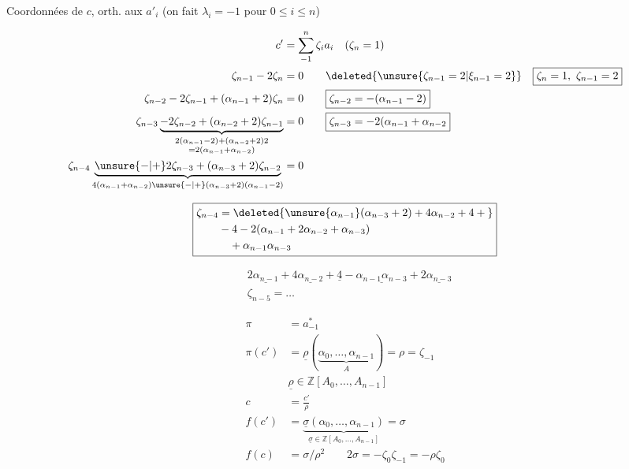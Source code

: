 Coordonnées  de $c$, orth. aux $a'_i$ (on fait $\lambda_i=-1$ pour $0\le i\le n$)

\[
\begin{aligned}
c'&=\sum_{-1}^{n}\zeta_i a_i\quad(\zeta_n=1)\\
\zeta_{n-1}-2\zeta_n&=0\qquad\deleted{\unsure{\zeta_{n-1}=2|\xi_{n-1}=2}}\quad\boxed{\zeta_n=1,\ \zeta_{n-1}=2}\\
\zeta_{n-2}-2\zeta_{n-1}+(\alpha_{n-1}+2)\zeta_n&=0\qquad\boxed{\zeta_{n-2}=-(\alpha_{n-1}-2)}\\
\zeta_{n-3}\underbrace{-2\zeta_{n-2}+(\alpha_{n-2}+2)\zeta_{n-1}}_{\substack{2(\alpha_{n-1}-2)+(\alpha_{n-2}+2)2\\=2(\alpha_{n-1}+\alpha_{n-2})}}&=0
\qquad\boxed{\zeta_{n-3}=-2(\alpha_{n-1}+\alpha_{n-2}}\\
\zeta_{n-4}\underbrace{\unsure{-|+}2\zeta_{n-3}+(\alpha_{n-3}+2)\zeta_{n-2}}_{4(\alpha_{n-1}+\alpha_{n-2})\unsure{-|+}(\alpha_{n-3}+2)(\alpha_{n-1}-2)}&=0
\end{aligned}
\]

\[
\boxed{\begin{aligned}
\zeta_{n-4}&=\deleted{\unsure{\alpha_{n-1}}(\alpha_{n-3}+2)+4\alpha_{n-2}+4+{}}\\
&-4-2(\alpha_{n-1}+2\alpha_{n-2}+\alpha_{n-3})\\
&\quad+\alpha_{n-1}\alpha_{n-3}
\end{aligned}}
\]

\[
\begin{aligned}
&2\underline{\alpha_{n-1}}+4\underline{\alpha_{n-2}}+\underline{4}-\underline{\alpha_{n-1}\alpha_{n-3}}+2\underline{\alpha_{n-3}}\\
&\zeta_{n-5}=\ldots
\end{aligned}
\]

\[
\begin{aligned}
\pi&=a_{-1}^*\\
\pi(c')&=\underline{\rho}(\underbrace{\alpha_0,\ldots,\alpha_{n-1}}_{A})=\rho=\zeta_{-1}\\
&\underline{\rho}\in\mathbb Z[A_0,\ldots,A_{n-1}]\\
c&=\frac{c'}{\rho}\\
f(c')&=\underbrace{\underline\sigma(\alpha_0,\ldots,\alpha_{n-1})}_{\underline\sigma\in\mathbb Z[A_0,\ldots,A_{n-1}]}=\sigma\\
f(c)&=\sigma/\rho^2\qquad 2\sigma=-\zeta_0\zeta_{-1}=-\rho\zeta_0
\end{aligned}
\]

